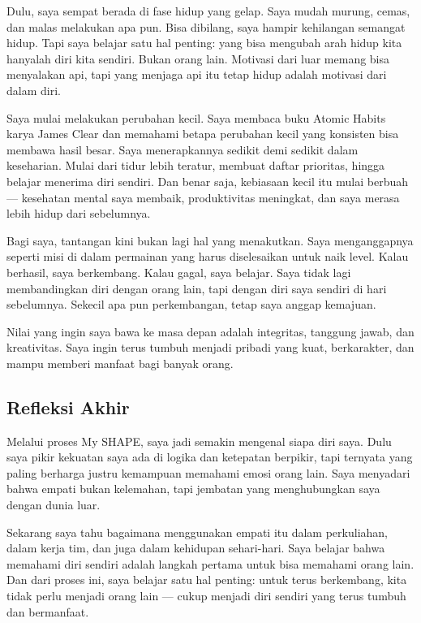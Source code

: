 \documentclass[
  letterpaper,
  DIV=11,
  numbers=noendperiod]{scrreprt}
\begin{document}
Dulu, saya sempat berada di fase hidup yang gelap. Saya mudah murung,
cemas, dan malas melakukan apa pun. Bisa dibilang, saya hampir
kehilangan semangat hidup. Tapi saya belajar satu hal penting: yang bisa
mengubah arah hidup kita hanyalah diri kita sendiri. Bukan orang lain.
Motivasi dari luar memang bisa menyalakan api, tapi yang menjaga api itu
tetap hidup adalah motivasi dari dalam diri.

Saya mulai melakukan perubahan kecil. Saya membaca buku Atomic Habits
karya James Clear dan memahami betapa perubahan kecil yang konsisten
bisa membawa hasil besar. Saya menerapkannya sedikit demi sedikit dalam
keseharian. Mulai dari tidur lebih teratur, membuat daftar prioritas,
hingga belajar menerima diri sendiri. Dan benar saja, kebiasaan kecil
itu mulai berbuah --- kesehatan mental saya membaik, produktivitas
meningkat, dan saya merasa lebih hidup dari sebelumnya.

Bagi saya, tantangan kini bukan lagi hal yang menakutkan. Saya
menganggapnya seperti misi di dalam permainan yang harus diselesaikan
untuk naik level. Kalau berhasil, saya berkembang. Kalau gagal, saya
belajar. Saya tidak lagi membandingkan diri dengan orang lain, tapi
dengan diri saya sendiri di hari sebelumnya. Sekecil apa pun
perkembangan, tetap saya anggap kemajuan.

Nilai yang ingin saya bawa ke masa depan adalah integritas, tanggung
jawab, dan kreativitas. Saya ingin terus tumbuh menjadi pribadi yang
kuat, berkarakter, dan mampu memberi manfaat bagi banyak orang.

\subsection{Refleksi Akhir}\label{refleksi-akhir}

Melalui proses My SHAPE, saya jadi semakin mengenal siapa diri saya.
Dulu saya pikir kekuatan saya ada di logika dan ketepatan berpikir, tapi
ternyata yang paling berharga justru kemampuan memahami emosi orang
lain. Saya menyadari bahwa empati bukan kelemahan, tapi jembatan yang
menghubungkan saya dengan dunia luar.

Sekarang saya tahu bagaimana menggunakan empati itu dalam perkuliahan,
dalam kerja tim, dan juga dalam kehidupan sehari-hari. Saya belajar
bahwa memahami diri sendiri adalah langkah pertama untuk bisa memahami
orang lain. Dan dari proses ini, saya belajar satu hal penting: untuk
terus berkembang, kita tidak perlu menjadi orang lain --- cukup menjadi
diri sendiri yang terus tumbuh dan bermanfaat.
\end{document}
